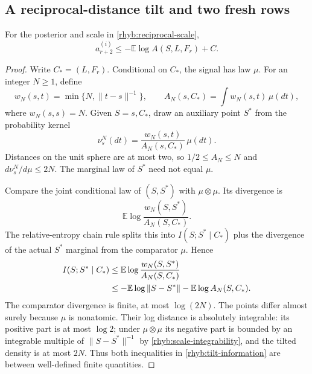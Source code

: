 \subsection{A reciprocal-distance tilt and two fresh rows}

\begin{lemma}\label{rhyb:tilted-coupling}
For the posterior and scale in \eqref{rhyb:reciprocal-scale},
\begin{equation}\label{rhyb:next-slope}
 a_{r+2}^{(i)}\le-\mathbb E\log A(S,L,F_r)+C.
\end{equation}
\end{lemma}

\begin{proof}
Write \(C_*=(L,F_r)\).  Conditional on \(C_*\), the signal has law
\(\mu\).  For an integer \(N\ge1\), define
\[
 w_N(s,t)=\min\{N,\|t-s\|^{-1}\},\qquad
 A_N(s,C_*)=\int w_N(s,t)\,\mu(dt),
\]
where \(w_N(s,s)=N\).  Given \(S=s,C_*\), draw an auxiliary point \(S^*\)
from the probability kernel
\[
 \nu_s^N(dt)=\frac{w_N(s,t)}{A_N(s,C_*)}\,\mu(dt).
\]
Distances on the unit sphere are at most two, so
\(1/2\le A_N\le N\) and \(d\nu_s^N/d\mu\le2N\).
The marginal law of \(S^*\) need not equal \(\mu\).

Compare the joint conditional law of \((S,S^*)\) with
\(\mu\otimes\mu\).  Its divergence is
\[
 \mathbb E\log\frac{w_N(S,S^*)}{A_N(S,C_*)}.
\]
The relative-entropy chain rule splits this into
\(I(S;S^*\mid C_*)\) plus the divergence of the
actual \(S^*\) marginal from the comparator \(\mu\).  Hence
\begin{align}
 I(S;S^*\mid C_*)
 &\le\mathbb E\log\frac{w_N(S,S^*)}{A_N(S,C_*)}\notag\\
 &\le-\mathbb E\log\|S-S^*\|
       -\mathbb E\log A_N(S,C_*).\label{rhyb:tilt-information}
\end{align}
The comparator divergence is finite, at most \(\log(2N)\).
The points differ almost surely because \(\mu\) is nonatomic.
Their log distance is absolutely integrable: its positive part is at
most \(\log2\); under \(\mu\otimes\mu\) its negative part is bounded by
an integrable multiple of \(\|S-S^*\|^{-1}\) by
\eqref{rhyb:scale-integrability}, and the tilted density is at most \(2N\).
Thus both inequalities in \eqref{rhyb:tilt-information} are between
well-defined finite quantities.


\end{proof}

